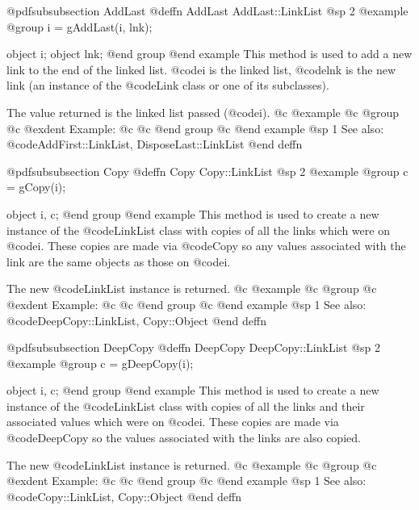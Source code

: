 @pdfsubsubsection {AddLast}
@deffn {AddLast} AddLast::LinkList
@sp 2
@example
@group
i = gAddLast(i, lnk);

object  i;
object  lnk;
@end group
@end example
This method is used to add a new link to the end of the linked list.
@code{i} is the linked list, @code{lnk} is the new link (an instance of
the @code{Link} class or one of its subclasses).

The value returned is the linked list passed (@code{i}).
@c @example
@c @group
@c @exdent Example:
@c 
@c @end group
@c @end example
@sp 1
See also:  @code{AddFirst::LinkList, DisposeLast::LinkList}
@end deffn






@pdfsubsubsection {Copy}
@deffn {Copy} Copy::LinkList
@sp 2
@example
@group
c = gCopy(i);

object  i, c;
@end group
@end example
This method is used to create a new instance of the @code{LinkList} class
with copies of all the links which were on @code{i}.  These copies
are made via @code{Copy} so any values associated with the link are
the same objects as those on @code{i}.

The new @code{LinkList} instance is returned.
@c @example
@c @group
@c @exdent Example:
@c 
@c @end group
@c @end example
@sp 1
See also:  @code{DeepCopy::LinkList, Copy::Object}
@end deffn













@pdfsubsubsection {DeepCopy}
@deffn {DeepCopy} DeepCopy::LinkList
@sp 2
@example
@group
c = gDeepCopy(i);

object  i, c;
@end group
@end example
This method is used to create a new instance of the @code{LinkList}
class with copies of all the links and their associated values which
were on @code{i}.  These copies are made via @code{DeepCopy} so
the values associated with the links are also copied.

The new @code{LinkList} instance is returned.
@c @example
@c @group
@c @exdent Example:
@c 
@c @end group
@c @end example
@sp 1
See also:  @code{Copy::LinkList, Copy::Object}
@end deffn














